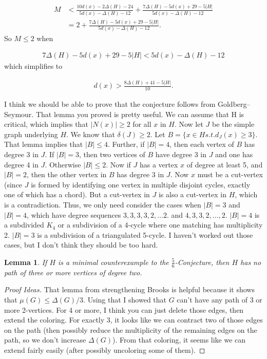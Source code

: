 \documentclass[12pt]{amsart}
\theoremstyle{plain}
\newtheorem{lem}[thm]{Lemma}
\theoremstyle{definition}
\theoremstyle{remark}
\begin{document}
\begin{align*}
M &< \frac{10d(x) - 2\Delta(H) - 24}{5d(x) - \Delta(H) - 12} + \frac{7\Delta(H) -
5d(x) + 29 - 5|H|}{5d(x) - \Delta(H) - 12} \\
&= 2 + \frac{7\Delta(H) - 5d(x) + 29 - 5|H|}{5d(x) - \Delta(H) - 12}.
\end{align*}
So $M\le 2$ when

\begin{align*}
7\Delta(H) - 5d(x) + 29 - 5|H| < 5d(x) - \Delta(H) - 12
\end{align*}
which simplifies to

\begin{align*}
d(x) > \frac{8\Delta(H) + 41 - 5|H|}{10}.
\end{align*}



\bigskip
\bigskip

I think we should be able to prove that the conjecture follows from
Goldberg--Seymour.
That lemma you proved is pretty useful.  We can assume that H is
critical, which implies that $|N(x)| \ge 2$ for all $x$ in $H$.  Now let $J$
be the simple graph underlying $H$.  We know that $\delta(J) \ge 2$.  Let
$B = \{ x \in H s.t. d_J(x) \ge 3\}$.  That lemma implies that $|B| \le 4$.
Further, if $|B| = 4$, then each vertex of $B$ has degree 3 in $J$.  If
$|B|=3$, then two vertices of $B$ have degree 3 in $J$ and one has degree 4
in $J$.  Otherwise $|B| \le 2$.  Now if $J$ has a vertex $x$ of degree at
least 5, and $|B|=2$, then the other vertex in $B$ has degree 3 in $J$.  Now
$x$ must be a cut-vertex (since $J$ is formed by identifying one vertex in
multiple disjoint cycles, exactly one of which has a chord).  But a
cut-vertex in $J$ is also a cut-vertex in $H$, which is a contradiction.
Thus, we only need consider the cases when $|B|=3$ and $|B|=4$, which have
degree sequences $3,3,3,3,2,\ldots2$. and $4,3,3,2,\ldots,2$.
$|B|=4$ is a subdivided $K_4$ or a subdivision of a 4-cycle where one
matching has multiplicity 2.
$|B|=3$ is a subdivision of a triangulated 5-cycle.  I haven't worked
out those cases, but I don't think they should be too hard.

\begin{lem}
If $H$ %
is a minimal counterexample to the $\frac56$-Conjecture, then $H$ has no
path of three or more vertices of degree two.
\label{no3path}
\end{lem}
\begin{proof}[Proof Ideas]
That lemma from strengthening Brooks is
helpful because it shows that $\mu(G) \le \Delta(G)/3$.  Using that I
showed that $G$ can't have any path of 3 or more 2-vertices.  For 4 or
more, I think you can just delete those edges, then extend the
coloring.  For exactly 3, it looks like we can contract two of those
edges on the path (then possibly reduce the multiplicity of the
remaining edges on the path, so we don't increase $\Delta(G)$). 
From that coloring, it seems like we can extend fairly easily
(after possibly uncoloring some of them).
\end{proof}
\end{document}
